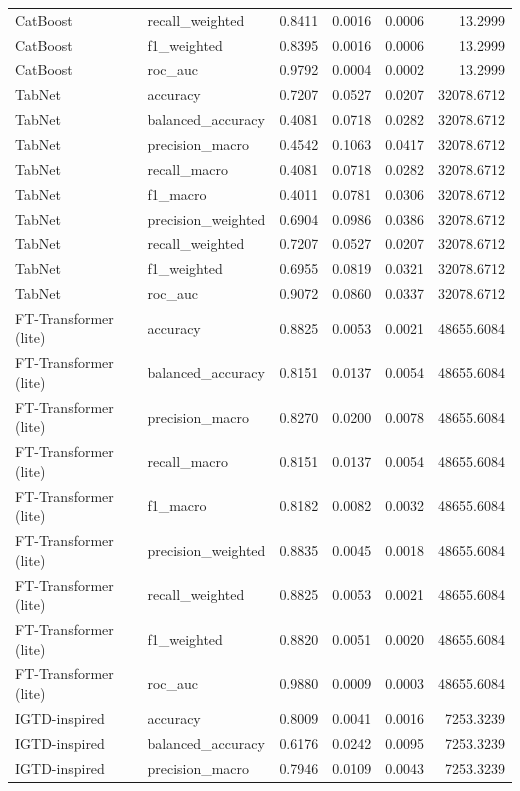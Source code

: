 \begin{tabular}{llrrrr}
CatBoost & recall_weighted & 0.8411 & 0.0016 & 0.0006 & 13.2999 \\
CatBoost & f1_weighted & 0.8395 & 0.0016 & 0.0006 & 13.2999 \\
CatBoost & roc_auc & 0.9792 & 0.0004 & 0.0002 & 13.2999 \\
TabNet & accuracy & 0.7207 & 0.0527 & 0.0207 & 32078.6712 \\
TabNet & balanced_accuracy & 0.4081 & 0.0718 & 0.0282 & 32078.6712 \\
TabNet & precision_macro & 0.4542 & 0.1063 & 0.0417 & 32078.6712 \\
TabNet & recall_macro & 0.4081 & 0.0718 & 0.0282 & 32078.6712 \\
TabNet & f1_macro & 0.4011 & 0.0781 & 0.0306 & 32078.6712 \\
TabNet & precision_weighted & 0.6904 & 0.0986 & 0.0386 & 32078.6712 \\
TabNet & recall_weighted & 0.7207 & 0.0527 & 0.0207 & 32078.6712 \\
TabNet & f1_weighted & 0.6955 & 0.0819 & 0.0321 & 32078.6712 \\
TabNet & roc_auc & 0.9072 & 0.0860 & 0.0337 & 32078.6712 \\
FT-Transformer (lite) & accuracy & 0.8825 & 0.0053 & 0.0021 & 48655.6084 \\
FT-Transformer (lite) & balanced_accuracy & 0.8151 & 0.0137 & 0.0054 & 48655.6084 \\
FT-Transformer (lite) & precision_macro & 0.8270 & 0.0200 & 0.0078 & 48655.6084 \\
FT-Transformer (lite) & recall_macro & 0.8151 & 0.0137 & 0.0054 & 48655.6084 \\
FT-Transformer (lite) & f1_macro & 0.8182 & 0.0082 & 0.0032 & 48655.6084 \\
FT-Transformer (lite) & precision_weighted & 0.8835 & 0.0045 & 0.0018 & 48655.6084 \\
FT-Transformer (lite) & recall_weighted & 0.8825 & 0.0053 & 0.0021 & 48655.6084 \\
FT-Transformer (lite) & f1_weighted & 0.8820 & 0.0051 & 0.0020 & 48655.6084 \\
FT-Transformer (lite) & roc_auc & 0.9880 & 0.0009 & 0.0003 & 48655.6084 \\
IGTD-inspired & accuracy & 0.8009 & 0.0041 & 0.0016 & 7253.3239 \\
IGTD-inspired & balanced_accuracy & 0.6176 & 0.0242 & 0.0095 & 7253.3239 \\
IGTD-inspired & precision_macro & 0.7946 & 0.0109 & 0.0043 & 7253.3239 \\

\end{tabular}
